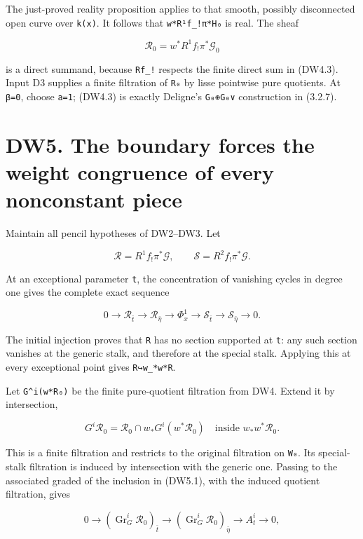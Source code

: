 \documentclass[
]{report}
\begin{document}
The just-proved reality proposition applies to that smooth, possibly
disconnected open curve over \texttt{k(x)}. It follows that
\texttt{w*R¹f\_!π*H₀} is real. The sheaf

\[
\mathcal R_0=w^*R^1f_!\pi^*\mathcal G_0
\tag{DW4.6}
\]

is a direct summand, because \texttt{Rf\_!} respects the finite direct
sum in (DW4.3). Input D3 supplies a finite filtration of \texttt{R₀} by
lisse pointwise pure quotients. At \texttt{β=0}, choose \texttt{a=1};
(DW4.3) is exactly Deligne's \texttt{G₀⊕G₀∨} construction in (3.2.7).

\section{DW5. The boundary forces the weight congruence of every
nonconstant
piece}\label{dw5.-the-boundary-forces-the-weight-congruence-of-every-nonconstant-piece}

Maintain all pencil hypotheses of DW2--DW3. Let

\[
\mathcal R=R^1f_!\pi^*\mathcal G,
\qquad
\mathcal S=R^2f_!\pi^*\mathcal G.
\]

At an exceptional parameter \texttt{t}, the concentration of vanishing
cycles in degree one gives the complete exact sequence

\[
0\longrightarrow\mathcal R_{\bar t}
\longrightarrow\mathcal R_{\bar\eta}
\longrightarrow\Phi_x^1
\longrightarrow\mathcal S_{\bar t}
\longrightarrow\mathcal S_{\bar\eta}
\longrightarrow0.
\tag{DW5.1}
\]

The initial injection proves that \texttt{R} has no section supported at
\texttt{t}: any such section vanishes at the generic stalk, and
therefore at the special stalk. Applying this at every exceptional point
gives \texttt{R↪w\_*w*R}.

Let \texttt{G\^{}i(w*R₀)} be the finite pure-quotient filtration from
DW4. Extend it by intersection,

\[
G^i\mathcal R_0
=\mathcal R_0\cap w_*G^i(w^*\mathcal R_0)
\quad\text{inside }w_*w^*\mathcal R_0.
\tag{DW5.2}
\]

This is a finite filtration and restricts to the original filtration on
\texttt{W₀}. Its special-stalk filtration is induced by intersection
with the generic one. Passing to the associated graded of the inclusion
in (DW5.1), with the induced quotient filtration, gives

\[
0\to(\operatorname{Gr}_G^i\mathcal R_0)_{\bar t}
\to(\operatorname{Gr}_G^i\mathcal R_0)_{\bar\eta}
\to A_t^i\to0,
\tag{DW5.3}
\]
\end{document}
